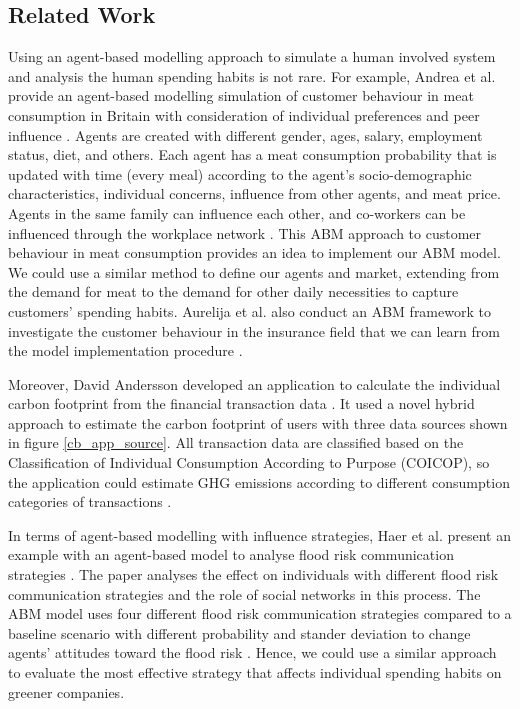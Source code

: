 \documentclass[a4paper,11pt]{article}
\begin{document}
\subsection{Related Work}
Using an agent-based modelling approach to simulate a human involved system and analysis the human spending habits is not rare. For example, Andrea et al. provide an agent-based modelling simulation of customer behaviour in meat consumption in Britain with consideration of individual preferences and peer influence \cite{ABM_meat}. 
Agents are created with different gender, ages, salary, employment status, diet, and others. Each agent has a meat consumption probability that is updated with time (every meal) according to the agent's socio-demographic characteristics, individual concerns, influence from other agents, and meat price.
Agents in the same family can influence each other, and co-workers can be influenced through the workplace network \cite{ABM_meat}.
This ABM approach to customer behaviour in meat consumption provides an idea to implement our ABM model. We could use a similar method to define our agents and market, extending from the demand for meat to the demand for other daily necessities to capture customers' spending habits.
Aurelija et al. also conduct an ABM framework to investigate the customer behaviour in the insurance field that we can learn from the model implementation procedure \cite{ABM_insu}.

Moreover, David Andersson developed an application to calculate the individual carbon footprint from the financial transaction data \cite{cb_app}. It used a novel hybrid approach to estimate the carbon footprint of users with three data sources shown in figure \ref{cb_app_source}. All transaction data are classified based on the Classification of Individual Consumption According to Purpose (COICOP), so the application could estimate GHG emissions according to different consumption categories of transactions \cite{cb_app}. 

In terms of agent-based modelling with influence strategies, Haer et al. present an example with an agent-based model to analyse flood risk communication strategies \cite{ABM_flood}. The paper analyses the effect on individuals with different flood risk communication strategies and the role of social networks in this process. The ABM model uses four different flood risk communication strategies compared to a baseline scenario with different probability and stander deviation to change agents' attitudes toward the flood risk \cite{ABM_flood}. Hence, we could use a similar approach to evaluate the most effective strategy that affects individual spending habits on greener companies.
\end{document}

